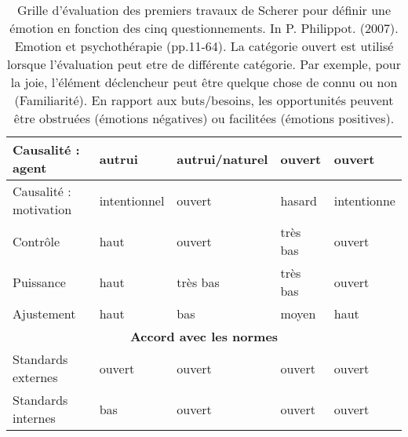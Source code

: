 \begin{table}[tbp]
\begin{tabular}{|l|l|l|l|l|}
Causalité : agent                                     & autrui                                                     & autrui/naturel                                      & ouvert                                                   & ouvert                                              \\ \hline
Causalité : motivation                                & intentionnel                                               & ouvert                                              & hasard                                                   & intentionne                                         \\ \hline
Contrôle                                              & haut                                                       & ouvert                                              & très bas                                                 & ouvert                                              \\ \hline
Puissance                                             & haut                                                       & très bas                                            & très bas                                                 & ouvert                                              \\ \hline
Ajustement                                            & haut                                                       & bas                                                 & moyen                                                    & haut                                                \\ \hline
\multicolumn{5}{|c|}{\textbf{Accord avec les normes}}                                                                                                                                                                                                                                     \\ \hline
Standards externes                                    & ouvert                                                     & ouvert                                              & ouvert                                                   & ouvert                                              \\ \hline
Standards internes                                    & bas                                                        & ouvert                                              & ouvert                                                   & ouvert                                              \\ \hline
\end{tabular}
\label{tab:Scherer}
\caption{Grille d'évaluation des premiers travaux de Scherer pour définir une émotion en fonction des cinq questionnements. In P. Philippot. (2007). Emotion et psychothérapie (pp.11-64). La catégorie ouvert est utilisé lorsque l'évaluation peut etre de différente catégorie. Par exemple, pour la joie, l'élément déclencheur peut être quelque chose de connu ou non (Familiarité). En rapport aux buts/besoins, les opportunités peuvent être obstruées (émotions négatives) ou facilitées (émotions positives).}
\end{table}
